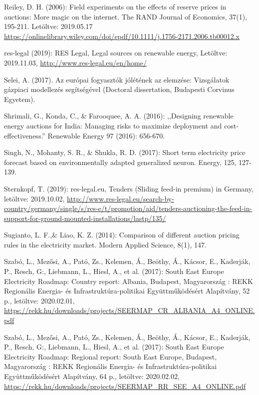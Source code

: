 \documentclass[twoside, magyar, showtrims]{corvinusphd}
\begin{document}
\begin{thebibliography}{99}
    Reiley, D. H. (2006): Field experiments on the effects of reserve prices in auctions: More magic on the internet. The RAND Journal of Economics, 37(1), 195-211. Letöltve: 2019.05.17
    \url{ https://onlinelibrary.wiley.com/doi/epdf/10.1111/j.1756-2171.2006.tb00012.x}

res-legal (2019): RES Legal, Legal sources on renewable energy, Letöltve: 2019.11.03,
\url{http://www.res-legal.eu/en/home/}

Selei, A. (2017). Az európai fogyasztók jólétének az elemzése: Vizsgálatok gázpiaci modellezés segítségével (Doctoral dissertation, Budapesti Corvinus Egyetem).

Shrimali, G., Konda, C., \& Farooquee, A. A. (2016): ,,Designing renewable energy auctions for India: Managing risks to maximize deployment and cost-effectiveness.'' Renewable Energy 97 (2016): 656-670.

Singh, N., Mohanty, S. R., \& Shukla, R. D. (2017): Short term electricity price forecast based on environmentally adapted generalized neuron. Energy, 125, 127-139.

Sternkopf, T. (2019): res-legal.eu, Tenders (Sliding feed-in premium) in Germany, letöltve: 2019.10.02,
\url{http://www.res-legal.eu/search-by-country/germany/single/s/res-e/t/promotion/aid/tenders-auctioning-the-feed-in-support-for-ground-mounted-installations/lastp/135/}

Sugianto, L. F.,\& Liao, K. Z. (2014): Comparison of different auction pricing rules in the electricity market. Modern Applied Science, 8(1), 147.

Szabó, L., Mezősi, A., Pató, Zs., Kelemen, Á., Beöthy, Á., Kácsor, E., Kaderják, P., Resch, G:, Liebmann, L., Hiesl, A., et al. (2017): South East Europe Electricity Roadmap: Country report: Albania, Budapest, Magyarország : REKK Regionális Energia- és Infrastruktúra-politikai Együttműködésért Alapítvány, 52 p., letöltve: 2020.02.01,
\url{https://rekk.hu/downloads/projects/SEERMAP_CR_ALBANIA_A4_ONLINE.pdf}

Szabó, L., Mezősi, A., Pató, Zs., Kelemen, Á., Beöthy, Á., Kácsor, E., Kaderják, P., Resch, G:, Liebmann, L., Hiesl, A., et al. (2017): South East Europe Electricity Roadmap: Regional report: South East Europe, Budapest, Magyarország : REKK Regionális Energia- és Infrastruktúra-politikai Együttműködésért Alapítvány, 64 p., letöltve: 2020.02.02,
\url{https://rekk.hu/downloads/projects/SEERMAP_RR_SEE_A4_ONLINE.pdf}


\end{thebibliography}
\end{document}
